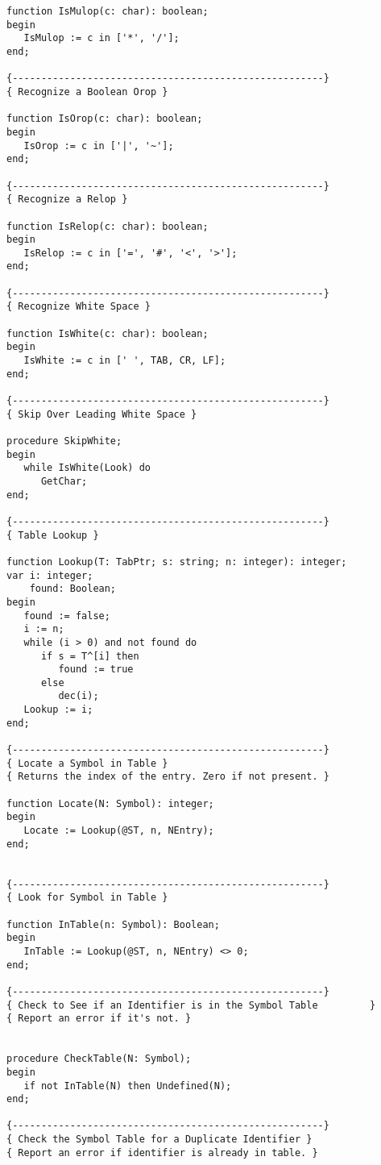 \begin{verbatim}
function IsMulop(c: char): boolean;
begin
   IsMulop := c in ['*', '/'];
end;

{------------------------------------------------------}
{ Recognize a Boolean Orop }

function IsOrop(c: char): boolean;
begin
   IsOrop := c in ['|', '~'];
end;

{------------------------------------------------------}
{ Recognize a Relop }

function IsRelop(c: char): boolean;
begin
   IsRelop := c in ['=', '#', '<', '>'];
end;

{------------------------------------------------------}
{ Recognize White Space }

function IsWhite(c: char): boolean;
begin
   IsWhite := c in [' ', TAB, CR, LF];
end;

{------------------------------------------------------}
{ Skip Over Leading White Space }

procedure SkipWhite;
begin
   while IsWhite(Look) do
      GetChar;
end;

{------------------------------------------------------}
{ Table Lookup }

function Lookup(T: TabPtr; s: string; n: integer): integer;
var i: integer;
    found: Boolean;
begin
   found := false;
   i := n;
   while (i > 0) and not found do
      if s = T^[i] then
         found := true
      else
         dec(i);
   Lookup := i;
end;

{------------------------------------------------------}
{ Locate a Symbol in Table }
{ Returns the index of the entry. Zero if not present. }

function Locate(N: Symbol): integer;
begin
   Locate := Lookup(@ST, n, NEntry);
end;


{------------------------------------------------------}
{ Look for Symbol in Table }

function InTable(n: Symbol): Boolean;
begin
   InTable := Lookup(@ST, n, NEntry) <> 0;
end;

{------------------------------------------------------}
{ Check to See if an Identifier is in the Symbol Table         }
{ Report an error if it's not. }


procedure CheckTable(N: Symbol);
begin
   if not InTable(N) then Undefined(N);
end;

{------------------------------------------------------}
{ Check the Symbol Table for a Duplicate Identifier }
{ Report an error if identifier is already in table. }


\end{verbatim}
